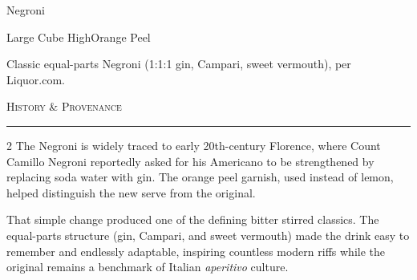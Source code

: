 \documentclass[4x6]{recipe-card}
\begin{document}
\begin{recipe}{Negroni}
\noindent\begin{minipage}{\textwidth}
\small\raggedright
{}\quad
{}\quad
Large Cube \quad High\quad Orange Peel
\end{minipage}\par\vspace{6pt}
\begin{ingredients}
\end{ingredients}
\begin{process}
\end{process}

\vfill
\begin{recipeinfo}
    Classic equal-parts Negroni (1:1:1 gin, Campari, sweet vermouth), per Liquor.com.
\end{recipeinfo}

\back
\begin{center}
    \small\textsc{\color{recipeRed} History \& Provenance}
    \rule{\textwidth}{0.4pt}
\end{center}
\begin{multicols}{2}
  \footnotesize The Negroni is widely traced to early 20th-century
  Florence, where Count Camillo Negroni reportedly asked for his
  Americano to be strengthened by replacing soda water with gin. The
  orange peel garnish, used instead of lemon, helped distinguish the
  new serve from the original.

  That simple change produced one of the defining bitter stirred
  classics. The equal-parts structure (gin, Campari, and sweet
  vermouth) made the drink easy to remember and endlessly adaptable,
  inspiring countless modern riffs while the original remains a
  benchmark of Italian \textit{aperitivo} culture.
\end{multicols}

\vfill
\drawBackMirrorSpiritBar
\noindent\hfill{}


\end{recipe}
\end{document}
